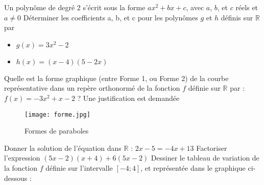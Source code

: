 \documentclass{exam}
\begin{document}
\begin{questions}
\question[1] Un polynôme de degré 2 s'écrit sous la forme $ax^2 + bx + c$, avec $a$, $b$, et $c$ réels et $a \neq 0$ Déterminer les coefficients a, b, et c pour les polynômes 
$g$ et $h$ définis sur $\mathbb{R}$ par
\begin{itemize}
  \item $g(x) = 3x^2 - 2$
  \item $h(x) = (x-4)(5-2x)$
\end{itemize}

\question[0.5] Quelle est la forme graphique (entre Forme 1, ou Forme 2) de la courbe représentative dans un repère orthonormé
de la fonction $f$ définie sur $\mathbb{R}$ par : $f(x) = -3x^2 + x - 2$ ?
Une justification est demandée

\begin{figure}[H]
  \centering
  \texttt{[image: forme.jpg]}
  \caption{\label{} Formes de paraboles}
\end{figure}

\question[0.5] Donner la solution de l'équation dans $\mathbb{R}$ : $2x - 5 = -4x + 13$
\question[1] Factoriser l'expression $(5x - 2)(x+4) + 6(5x -2)$
\question[1] Dessiner le tableau de variation de la fonction $f$ définie sur l'intervalle $[-4 ; 4]$, et représentée dans le graphique ci-dessous : 

 \par



\end{questions}
\end{document}
